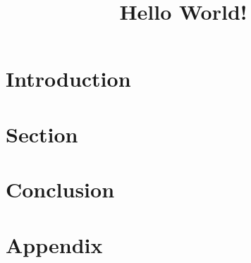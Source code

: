 \documentclass[12pt, a4paper]{article}
\title{Hello World!}
\author{}
\date{}
\begin{document}
\begin{titlepage}
\clearpage\maketitle
\thispagestyle{empty}
\begin{abstract}
\end{abstract}
\end{titlepage}

	\section{Introduction} \label{sec:introduction}
	
	\section{Section} \label{sec:}
	
	\section{Conclusion} \label{sec:conclusion}
	
	\newpage
	
	
	\newpage
	\appendix
	\section{Appendix} \label{sec:appendix}
	
\end{document}
